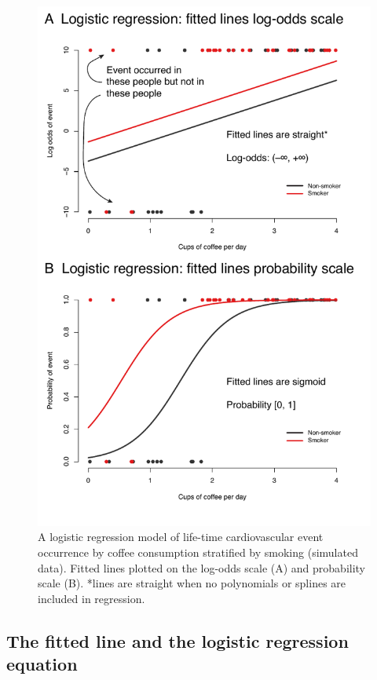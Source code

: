 \documentclass[
  12pt,
  krantz2]{krantz}
\begin{document}
\begin{figure}
\centering
\includegraphics{images/chapter09/2_prob_logodds.pdf}
\caption{\label{fig:chap09-fig-logodds}A logistic regression model of life-time cardiovascular event occurrence by coffee consumption stratified by smoking (simulated data). Fitted lines plotted on the log-odds scale (A) and probability scale (B). *lines are straight when no polynomials or splines are included in regression.}
\end{figure}

\hypertarget{the-fitted-line-and-the-logistic-regression-equation}{%
\subsection{The fitted line and the logistic regression equation}\label{the-fitted-line-and-the-logistic-regression-equation}}
\end{document}
